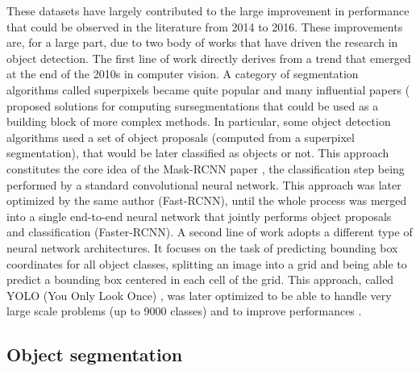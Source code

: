 These datasets have largely contributed to the large improvement in performance that could be observed in the literature from 2014 to 2016. These improvements are, for a large part, due to two body of works that have driven the research in object detection. The first line of work directly derives from a trend that emerged at the end of the 2010s in computer vision. A category of segmentation algorithms called superpixels became quite popular and many influential papers (\cite{felzenszwalb2004efficient, achanta2012slic, levinshtein2009turbopixels} proposed solutions for computing sursegmentations that could be used as a building block of more complex methods. In particular, some object detection algorithms used a set of object proposals \cite{uijlings2013selective} (computed from a superpixel segmentation), that would be later classified as objects or not. This approach constitutes the core idea of the Mask-RCNN paper \cite{girshick2014maskrcnn}, the classification step being performed by a standard convolutional neural network. This approach was later optimized by the same author \cite{girshick2014fastrcnn} (Fast-RCNN), until the whole process was merged into a single end-to-end neural network that jointly performs object proposals and classification \cite{ren2015faster} (Faster-RCNN). A second line of work adopts a different type of neural network architectures. It focuses on the task of predicting bounding box coordinates for all object classes, splitting an image into a grid and being able to predict a bounding box centered in each cell of the grid. This approach, called YOLO (You Only Look Once) \cite{redmon2016you}, was later optimized to be able to handle very large scale problems \cite{redmon2017yolo9000} (up to 9000 classes) and to improve performances \cite{redmon2018yolov3}. 

\subsection{Object segmentation}

